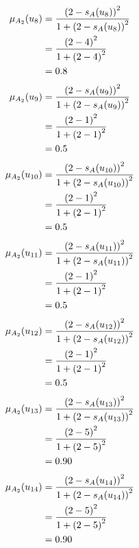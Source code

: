 \documentclass[a4paper]{book}
\begin{document}
				\begin{align}
					\mu_{A_2}(u_8) &= \frac{\left(2-s_A(u_8)\right)^2}{1 + \left(2-s_A(u_8)\right)^2}\\
					&= \frac{\left(2-4\right)^2}{1 + \left(2-4\right)^2} \notag \\
					&= 0.8 \notag
				\end{align}
				\begin{align}
					\mu_{A_2}(u_9) &= \frac{\left(2-s_A(u_9)\right)^2}{1 + \left(2-s_A(u_9)\right)^2}\\
					&= \frac{\left(2-1\right)^2}{1 + \left(2-1\right)^2} \notag \\
					&= 0.5 \notag
				\end{align}
				\begin{align}
					\mu_{A_2}(u_{10}) &= \frac{\left(2-s_A(u_{10})\right)^2}{1 + \left(2-s_A(u_{10})\right)^2}\\
					&= \frac{\left(2-1\right)^2}{1 + \left(2-1\right)^2} \notag \\
					&= 0.5 \notag
				\end{align}
				\begin{align}
					\mu_{A_2}(u_{11}) &= \frac{\left(2-s_A(u_{11})\right)^2}{1 + \left(2-s_A(u_{11})\right)^2}\\
					&= \frac{\left(2-1\right)^2}{1 + \left(2-1\right)^2} \notag \\
					&= 0.5 \notag
				\end{align}
				\begin{align}
					\mu_{A_2}(u_{12}) &= \frac{\left(2-s_A(u_{12})\right)^2}{1 + \left(2-s_A(u_{12})\right)^2}\\
					&= \frac{\left(2-1\right)^2}{1 + \left(2-1\right)^2} \notag \\
					&= 0.5 \notag
				\end{align}
				\begin{align}
					\mu_{A_2}(u_{13}) &= \frac{\left(2-s_A(u_{13})\right)^2}{1 + \left(2-s_A(u_{13})\right)^2}\\
					&= \frac{\left(2-5\right)^2}{1 + \left(2-5\right)^2} \notag \\
					&= 0.90 \notag
				\end{align}
				\begin{align}
					\mu_{A_2}(u_{14}) &= \frac{\left(2-s_A(u_{14})\right)^2}{1 + \left(2-s_A(u_{14})\right)^2}\\
					&= \frac{\left(2-5\right)^2}{1 + \left(2-5\right)^2} \notag \\
					&= 0.90 \notag
				\end{align}
\end{document}
